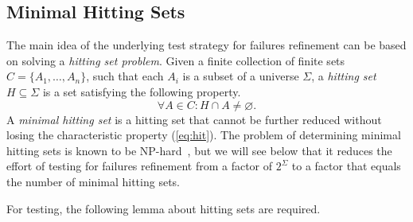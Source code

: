 
%

\subsection{Minimal Hitting Sets}
\label{sec:hit}

The main idea of the underlying test strategy for failures refinement can be
based on solving a \emph{hitting set problem}. Given a finite collection of
finite sets $C = \{ A_1,\dots,A_n\}$, such that each $A_i$ is a subset of a
universe $\Sigma$, a \emph{hitting set} $H\subseteq\Sigma$ is a set
satisfying the following property.
%
\begin{equation}
  \label{eq:hit}
  \forall A\in C: H\cap A \neq\varnothing.
\end{equation}
%
A \emph{minimal hitting set} is a hitting set that cannot be further reduced
without losing the characteristic property (\ref{eq:hit}). The problem of
determining minimal hitting sets is known to be
NP-hard~\cite{Book1975-BOOKRM}, but we will see below that it reduces the
effort of testing for failures refinement from a factor of $2^\Sigma$ to a
factor that equals the number of minimal hitting sets.

For testing, the following lemma about hitting sets are required.

